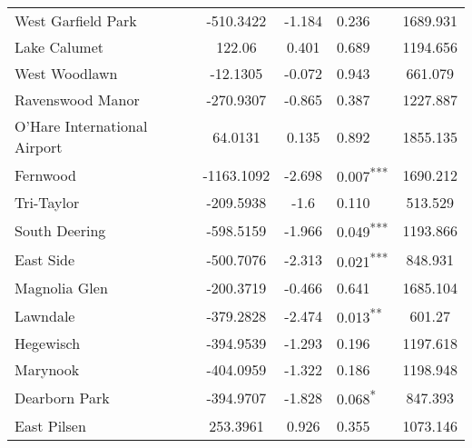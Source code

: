 \documentclass[12pt]{report}
\begin{document}
\begin{longtable}{l S[table-format=6.4] S[table-format=3.4] l S[table-format=4.4]}
	West Garfield Park           & -510.3422            & -1.184           & 0.236                      & 1689.931                          \\
	Lake Calumet                 & 122.06               & 0.401            & 0.689                      & 1194.656                          \\
	West Woodlawn                & -12.1305             & -0.072           & 0.943                      & 661.079                           \\
	Ravenswood Manor             & -270.9307            & -0.865           & 0.387                      & 1227.887                          \\
	O'Hare International Airport & 64.0131              & 0.135            & 0.892                      & 1855.135                          \\
	Fernwood                     & -1163.1092           & -2.698           & 0.007\textsuperscript{***} & 1690.212                          \\
	Tri-Taylor                   & -209.5938            & -1.6             & 0.110                      & 513.529                           \\
	South Deering                & -598.5159            & -1.966           & 0.049\textsuperscript{***} & 1193.866                          \\
	East Side                    & -500.7076            & -2.313           & 0.021\textsuperscript{***} & 848.931                           \\
	Magnolia Glen                & -200.3719            & -0.466           & 0.641                      & 1685.104                          \\
	Lawndale                     & -379.2828            & -2.474           & 0.013\textsuperscript{**}  & 601.27                            \\
	Hegewisch                    & -394.9539            & -1.293           & 0.196                      & 1197.618                          \\
	Marynook                     & -404.0959            & -1.322           & 0.186                      & 1198.948                          \\
	Dearborn Park                & -394.9707            & -1.828           & 0.068\textsuperscript{*}   & 847.393                           \\
	East Pilsen                  & 253.3961             & 0.926            & 0.355                      & 1073.146                          \\

\end{longtable}
\end{document}
